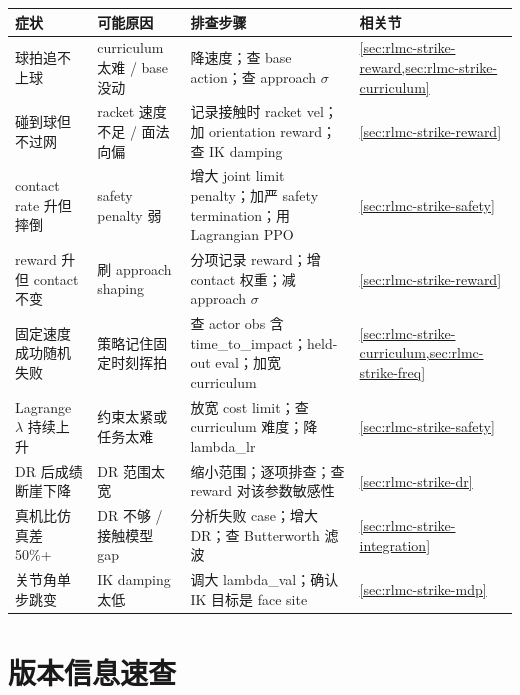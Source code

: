 \begin{center}
\small
\begin{tabular}{@{}p{3.0cm}p{3.2cm}p{4.8cm}l@{}}
\toprule
症状 & 可能原因 & 排查步骤 & 相关节 \\
\midrule
球拍追不上球 & curriculum 太难 / base 没动 & 降速度；查 base action；查 approach $\sigma$ & \cref{sec:rlmc-strike-reward,sec:rlmc-strike-curriculum} \\
碰到球但不过网 & racket 速度不足 / 面法向偏 & 记录接触时 racket vel；加 orientation reward；查 IK damping & \cref{sec:rlmc-strike-reward} \\
contact rate 升但摔倒 & safety penalty 弱 & 增大 joint limit penalty；加严 safety termination；用 Lagrangian PPO & \cref{sec:rlmc-strike-safety} \\
reward 升但 contact 不变 & 刷 approach shaping & 分项记录 reward；增 contact 权重；减 approach $\sigma$ & \cref{sec:rlmc-strike-reward} \\
固定速度成功随机失败 & 策略记住固定时刻挥拍 & 查 actor obs 含 time\_to\_impact；held-out eval；加宽 curriculum & \cref{sec:rlmc-strike-curriculum,sec:rlmc-strike-freq} \\
Lagrange $\lambda$ 持续上升 & 约束太紧或任务太难 & 放宽 cost limit；查 curriculum 难度；降 lambda\_lr & \cref{sec:rlmc-strike-safety} \\
DR 后成绩断崖下降 & DR 范围太宽 & 缩小范围；逐项排查；查 reward 对该参数敏感性 & \cref{sec:rlmc-strike-dr} \\
真机比仿真差 50\%+ & DR 不够 / 接触模型 gap & 分析失败 case；增大 DR；查 Butterworth 滤波 & \cref{sec:rlmc-strike-integration} \\
关节角单步跳变 & IK damping 太低 & 调大 lambda\_val；确认 IK 目标是 face site & \cref{sec:rlmc-strike-mdp} \\
\bottomrule
\end{tabular}
\end{center}

\section*{版本信息速查}
\label{sec:rlmc-strike-versions}

